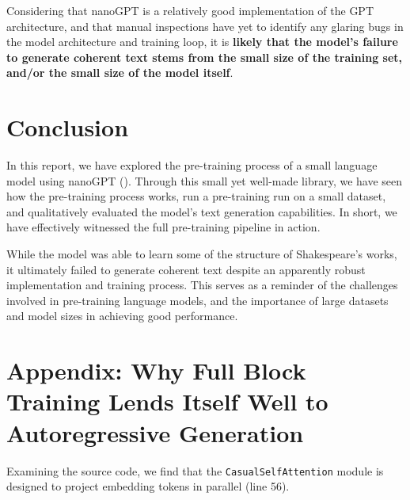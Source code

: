 \documentclass{article} %
\theoremstyle{definition}
\begin{document}
Considering that nanoGPT is a relatively good implementation of the GPT architecture,
and that manual inspections have yet to identify any glaring bugs in the model architecture
and training loop, it is \textbf{likely that the model's failure to generate coherent text
stems from the small size of the training set, and/or the small size of the model itself}.

\section{Conclusion}
In this report, we have explored the pre-training process of a small language model
using nanoGPT (\cite{nanoGPT}). Through this small yet well-made library, 
we have seen how the pre-training process works,
run a pre-training run on a small dataset,
and qualitatively evaluated the model's text generation capabilities.
In short, we have effectively witnessed the full pre-training pipeline in action.

While the model was able to learn some of the structure of Shakespeare's works,
it ultimately failed to generate coherent text despite an apparently robust implementation
and training process.
This serves as a reminder of the challenges involved in pre-training language models,
and the importance of large datasets and model sizes in achieving good performance.




\appendix

\section{Appendix: Why Full Block Training Lends Itself Well to Autoregressive Generation}
\label{sec:appendix_autoregressive}

Examining the source code, we find that the \texttt{CasualSelfAttention}
module is designed to project embedding tokens in parallel (line 56).



\end{document}

